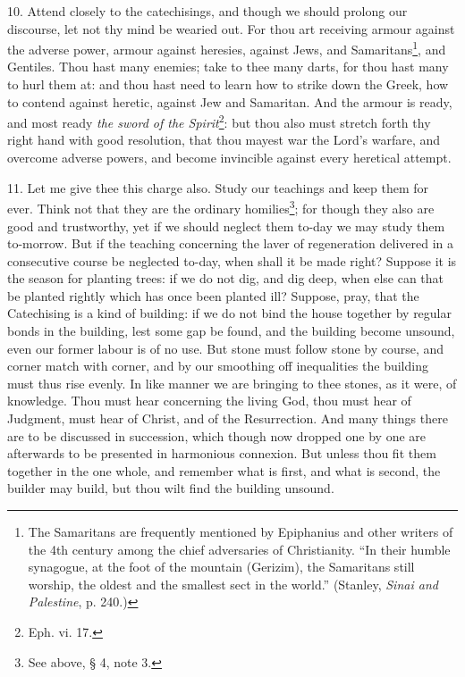10. Attend closely to the catechisings, and though we should prolong our discourse, let not thy mind be wearied out. For thou art receiving armour against the adverse power, armour against heresies, against Jews, and Samaritans\footnote{The Samaritans are frequently mentioned by Epiphanius and other writers of the 4th century among the chief adversaries of Christianity. “In their humble synagogue, at the foot of the mountain (Gerizim), the Samaritans still worship, the oldest and the smallest sect in the world.” (Stanley, \emph{Sinai and Palestine}, p. 240.)}, and Gentiles. Thou hast many enemies; take to thee many darts, for thou hast many to hurl them at: and thou hast need to learn how to strike down the Greek, how to contend against heretic, against Jew and Samaritan. And the armour is ready, and most ready \emph{the sword of the Spirit}\footnote{Eph. vi. 17.}: but thou also must stretch forth thy right hand with good resolution, that thou mayest war the Lord’s warfare, and overcome adverse powers, and become invincible against every heretical attempt.

11. Let me give thee this charge also. Study our teachings and keep them for ever. Think not that they are the ordinary homilies\footnote{See above, § 4, note 3.}; for though they also are good and trustworthy, yet if we should neglect them to-day we may study them to-morrow. But if the teaching concerning the laver of regeneration delivered in a consecutive course be neglected to-day, when shall it be made right? Suppose it is the season for planting trees: if we do not dig, and dig deep, when else can that be planted rightly which has once been planted ill? Suppose, pray, that the Catechising is a kind of building: if we do not bind the house together by regular bonds in the building, lest some gap be found, and the building become unsound, even our former labour is of no use. But stone must follow stone by course, and corner match with corner, and by our smoothing off inequalities the building must thus rise evenly. In like manner we are bringing to thee stones, as it were, of knowledge. Thou must hear concerning the living God, thou must hear of Judgment, must hear of Christ, and of the Resurrection. And many things there are to be discussed in succession, which though now dropped one by one are afterwards to be presented in harmonious connexion. But unless thou fit them together in the one whole, and remember what is first, and what is second, the builder may build, but thou wilt find the building unsound.

